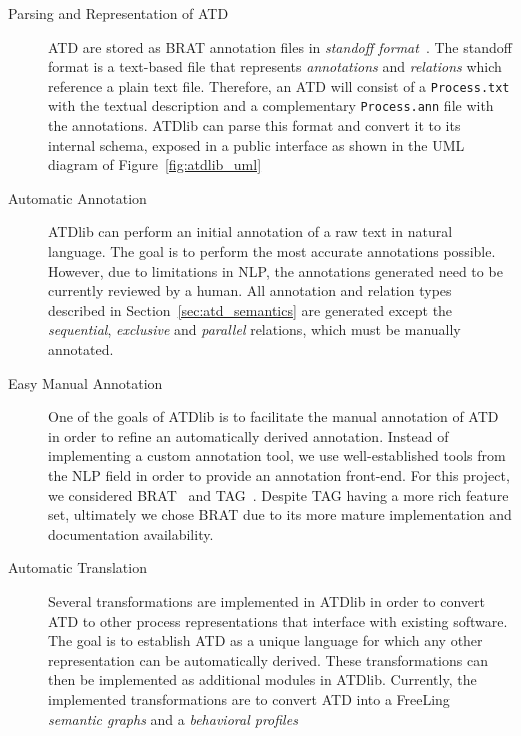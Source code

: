 \begin{description}
  \item[Parsing and Representation of ATD]{ATD are stored as BRAT annotation
      files in \emph{standoff format}~\cite{brat_standoff}. The standoff format
      is a text-based file that represents \emph{annotations} and
      \emph{relations} which reference a plain text file. Therefore, an ATD will
      consist of a \texttt{Process.txt} with the textual description and a
      complementary \texttt{Process.ann} file with the annotations. ATDlib can
      parse this format and convert it to its internal schema, exposed in a
      public interface as shown in the UML diagram of
      Figure~\ref{fig:atdlib_uml}}
  \item[Automatic Annotation]{ATDlib can perform an initial annotation of a raw
      text in natural language. The goal is to perform the most accurate
      annotations possible. However, due to limitations in NLP, the annotations
      generated need to be currently reviewed by a human. All annotation and
      relation types described in Section~\ref{sec:atd_semantics} are generated
      except the \emph{sequential}, \emph{exclusive} and \emph{parallel}
      relations, which must be manually annotated.}
  \item[Easy Manual Annotation]{One of the goals of ATDlib is to facilitate the
      manual annotation of ATD in order to refine an automatically derived
      annotation. Instead of implementing a custom annotation tool, we use
      well-established tools from the NLP field in order to provide an
      annotation front-end. For this project, we considered BRAT~\cite{stenetorp2012brat} and TAG~\cite{DBLP:journals/corr/abs-1711-00529}. 
      Despite TAG having a more rich feature set, ultimately we chose BRAT due
      to its more mature implementation and documentation availability.}
  \item[Automatic Translation]{Several transformations are implemented in ATDlib
      in order to convert ATD to other process representations that interface with
      existing software. The goal is to establish ATD as a unique language for
      which any other representation can be automatically derived. These
      transformations can then be implemented as additional modules in ATDlib.
      Currently, the implemented transformations are to convert ATD into a
      FreeLing~\cite{PadroS12} \emph{semantic graphs} and a \emph{behavioral
        profiles}~\cite{smirnov2010business}}
\end{description}

